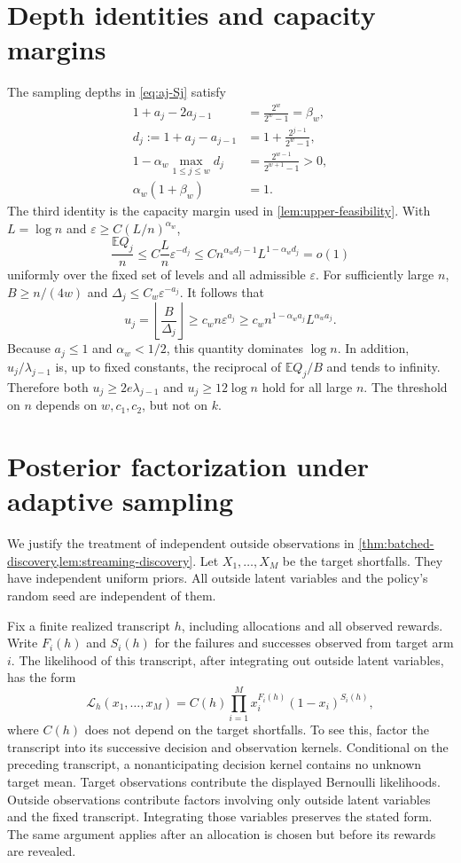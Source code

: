 \documentclass[11pt,letterpaper]{article}
\numberwithin{equation}{section}
\theoremstyle{definition}
\theoremstyle{remark}
\newcommand{\E}{\mathbb{E}}
\newcommand{\1}{\mathbf{1}}
\newcommand{\eps}{\varepsilon}
\begin{document}
\appendix

\section{Depth identities and capacity margins}\label{app:algebra}

The sampling depths in \cref{eq:aj-Sj} satisfy
\begin{align*}
  1+a_j-2a_{j-1}&=\frac{2^w}{2^w-1}=\beta_w,\\
  d_j:=1+a_j-a_{j-1}&=1+\frac{2^{j-1}}{2^w-1},\\
  1-\alpha_w\max_{1\le j\le w}d_j
    &=\frac{2^{w-1}}{2^{w+1}-1}>0,\\
  \alpha_w(1+\beta_w)&=1.
\end{align*}
The third identity is the capacity margin used in
\cref{lem:upper-feasibility}. With $L=\log n$ and
$\eps\ge C(L/n)^{\alpha_w}$,
\[
  \frac{\E Q_j}{n}
  \le C\frac{L}{n}\eps^{-d_j}
  \le C n^{\alpha_wd_j-1}L^{1-\alpha_wd_j}
  =o(1)
\]
uniformly over the fixed set of levels and all admissible $\eps$.
For sufficiently large $n$, $B\ge n/(4w)$ and
$\Delta_j\le C_w\eps^{-a_j}$. It follows that
\[
  u_j=\left\lfloor\frac{B}{\Delta_j}\right\rfloor
  \ge c_w n\eps^{a_j}
  \ge c_w n^{1-\alpha_wa_j}L^{\alpha_wa_j}.
\]
Because $a_j\le1$ and $\alpha_w<1/2$, this quantity dominates
$\log n$. In addition,
$u_j/\lambda_{j-1}$ is, up to fixed constants, the reciprocal of
$\E Q_j/B$ and tends to infinity. Therefore both
$u_j\ge2e\lambda_{j-1}$ and $u_j\ge12\log n$ hold for all large $n$.
The threshold on $n$ depends on $w,c_1,c_2$, but not on $k$.

\section{Posterior factorization under adaptive sampling}\label{app:external}

We justify the treatment of independent outside observations in
\cref{thm:batched-discovery,lem:streaming-discovery}.
Let $X_1,\ldots,X_M$ be the target shortfalls. They have independent
uniform priors. All outside latent variables and the policy's random
seed are independent of them.

Fix a finite realized transcript $h$, including allocations and all
observed rewards. Write $F_i(h)$ and $S_i(h)$ for the failures and
successes observed from target arm $i$. The likelihood of this
transcript, after integrating out outside latent variables, has the form
\begin{equation}\label{eq:likelihood-factorization}
  \mathcal L_h(x_1,\ldots,x_M)
  =C(h)\prod_{i=1}^{M}x_i^{F_i(h)}(1-x_i)^{S_i(h)},
\end{equation}
where $C(h)$ does not depend on the target shortfalls.
To see this, factor the transcript into its successive decision and
observation kernels. Conditional on the preceding transcript, a
nonanticipating decision kernel contains no unknown target mean.
Target observations contribute the displayed Bernoulli likelihoods.
Outside observations contribute factors involving only outside
latent variables and the fixed transcript. Integrating those
variables preserves the stated form. The same argument applies
after an allocation is chosen but before its rewards are revealed.
\end{document}
